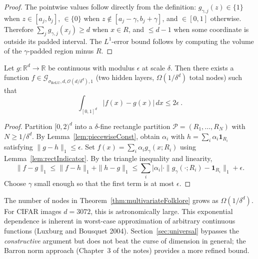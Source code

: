 \begin{proof}
  The pointwise values follow directly from the definition: $g_{\gamma,j}(z) \in \{1\}$ when $z \in [a_j, b_j]$, $\in \{0\}$ when $z \notin [a_j - \gamma, b_j + \gamma]$, and $\in [0,1]$ otherwise.
  Therefore $\sum_j g_{\gamma,j}(x_j) \ge d$ when $x \in R$, and $\le d-1$ when some coordinate is outside its padded interval.
  The $L^1$-error bound follows by computing the volume of the $\gamma$-padded region minus $R$.
\end{proof}

\begin{theorem}\label{thm:multivariateFolklore}
Let $g : \mathbb{R}^d \to \mathbb{R}$ be continuous with modulus $\epsilon$ at scale $\delta$.
Then there exists a function $f \in \mathcal{G}_{\sigma_\mathrm{ReLU}, d, \mathcal{O}(d/\delta^d), 1}$ (two hidden layers, $\Omega(1/\delta^d)$ total nodes) such that
\[
  \int_{[0,1]^d} |f(x) - g(x)| \, dx \le 2\epsilon
  \: .
\]
\end{theorem}

\begin{proof}
  Partition $[0,2)^d$ into a $\delta$-fine rectangle partition $\mathcal{P} = (R_1, \ldots, R_N)$ with $N \ge 1/\delta^d$.
  By Lemma~\ref{lem:piecewiseConst}, obtain $\alpha_i$ with $h = \sum_i \alpha_i \mathbf{1}_{R_i}$ satisfying $\|g - h\|_1 \le \epsilon$.
  Set $f(x) = \sum_i \alpha_i g_\gamma(x; R_i)$ using Lemma~\ref{lem:rectIndicator}.
  By the triangle inequality and linearity,
  \[
    \|f - g\|_1 \le \|f - h\|_1 + \|h - g\|_1
    \le \sum_i |\alpha_i| \cdot \|g_\gamma(\cdot; R_i) - \mathbf{1}_{R_i}\|_1 + \epsilon.
  \]
  Choose $\gamma$ small enough so that the first term is at most $\epsilon$.
\end{proof}

\begin{remark}
  The number of nodes in Theorem~\ref{thm:multivariateFolklore} grows as $\Omega(1/\delta^d)$.
  For CIFAR images $d = 3072$, this is astronomically large.
  This exponential dependence is inherent in worst-case approximation of arbitrary continuous functions (Luxburg and Bousquet 2004).
  Section~\ref{sec:universal} bypasses the \emph{constructive} argument but does not beat the curse of dimension in general; the Barron norm approach (Chapter~3 of the notes) provides a more refined bound.
\end{remark}


